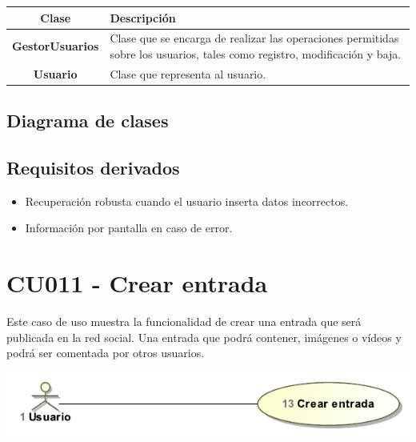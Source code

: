 \documentclass[12pt, a4paper, titlepage]{article}
\begin{document}
\begin{center}

\begin{tabular}{|c|p{14cm}|}
	\hline
	\textbf{Clase} & \textbf{Descripción}\\ \hline
	\textbf{GestorUsuarios} &  Clase que se encarga de realizar las operaciones permitidas sobre los usuarios, tales como registro, modificación y baja.\\ \hline
	\textbf{Usuario} & Clase que representa al usuario. \\ \hline
\end{tabular}

\end{center}

\subsection{Diagrama de clases}

\subsection{Requisitos derivados}

\begin{itemize}
	\item Recuperación robusta cuando el usuario inserta datos incorrectos.
	\item Información por pantalla en caso de error.
\end{itemize}

\section{CU011 - Crear entrada}


Este caso de uso muestra la funcionalidad de crear una entrada que será publicada en la red social. Una entrada que podrá contener, imágenes o vídeos y podrá ser comentada por otros usuarios.

\begin{center}
	\includegraphics{Imagenes/CrearEntradaCU.pdf}
\end{center}
\end{document}
